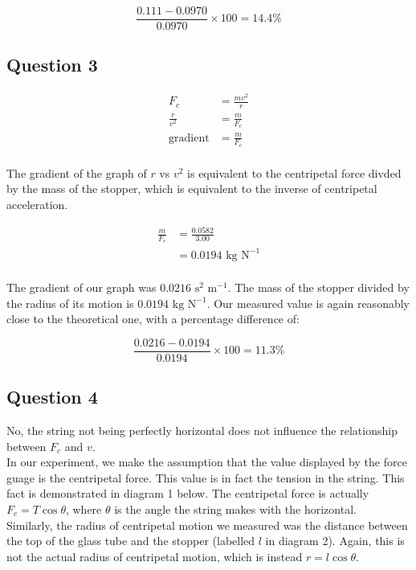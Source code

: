 \documentclass[a4paper,11pt]{article}
\begin{document}
$$
\frac{0.111 - 0.0970}{0.0970} \times 100 = 14.4\%
$$


\subsection{Question 3}

\begin{align*}
				F_c & = \frac{mv^2}{r} \\
	  \frac{r}{v^2} & = \frac{m}{F_c} \\
	\mbox{gradient} & = \frac{m}{F_c} \\
\end{align*}

The gradient of the graph of $r$ vs $v^2$ is equivalent to the centripetal force
divded by the mass of the stopper, which is equivalent to the inverse of
centripetal acceleration.

\begin{align*}
	\frac{m}{F_c} & = \frac{0.0582}{3.00} \\
				  & = 0.0194\mbox{ kg N}^{-1} \\
\end{align*}

The gradient of our graph was $0.0216\mbox{ s}^{2}\mbox{ m}^{-1}$. The mass of
the stopper divided by the radius of its motion is $0.0194\mbox{ kg N}^{-1}$.
Our measured value is again reasonably close to the theoretical one, with a
percentage difference of:

$$
\frac{0.0216 - 0.0194}{0.0194} \times 100 = 11.3\%
$$


\subsection{Question 4}

No, the string not being perfectly horizontal does not influence the
relationship between $F_c$ and $v$. \\

In our experiment, we make the assumption that the value displayed by the force
guage is the centripetal force. This value is in fact the tension in the string.
This fact is demonstrated in diagram 1 below. The centripetal force is actually
$F_c = T \cos{\theta}$, where $\theta$ is the angle the string makes with the
horizontal. \\

Similarly, the radius of centripetal motion we measured was the distance between
the top of the glass tube and the stopper (labelled $l$ in diagram 2). Again,
this is not the actual radius of centripetal motion, which is instead
$r = l \cos{\theta}$. \\
\end{document}

